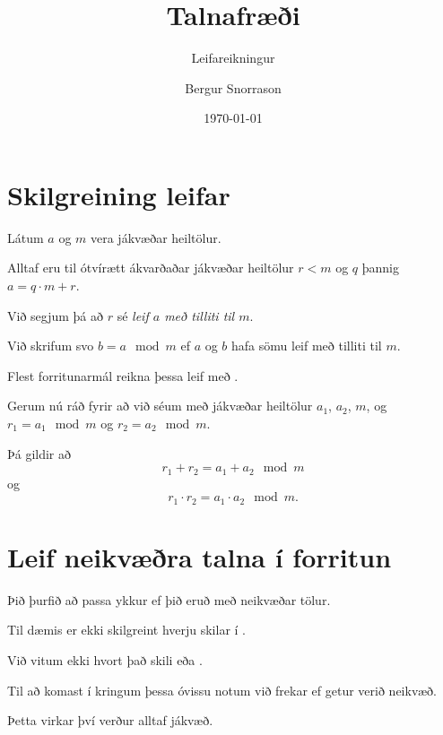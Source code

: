 \title{Talnafræði}
\subtitle{Leifareikningur}
\author{Bergur Snorrason}
\date{\today}



\frame{\titlepage}

\section{Skilgreining leifar}
{
    {
        \item<1-> Látum $a$ og $m$ vera jákvæðar heiltölur.
        \item<2-> Alltaf eru til ótvírætt ákvarðaðar jákvæðar heiltölur $r < m$ og $q$ þannig $a = q \cdot m + r$.
        \item<3-> Við segjum þá að $r$ sé \emph{leif $a$ með tilliti til $m$}.
        \item<4-> Við skrifum svo $b = a \mod m$ ef $a$ og $b$ hafa sömu leif með tilliti til $m$.
        \item<5-> Flest forritunarmál reikna þessa leif með .
        \item<6-> Gerum nú ráð fyrir að við séum með jákvæðar heiltölur $a_1$, $a_2$, $m$, og $r_1 = a_1 \mod m$ og $r_2 = a_2 \mod m$.
        \item<7-> Þá gildir að
        \[
            r_1 + r_2 = a_1 + a_2 \mod m
        \]
                og
        \[
            r_1 \cdot r_2 = a_1 \cdot a_2 \mod m.
        \]
    }
}

\section{Leif neikvæðra talna í forritun}
{
    {
        \item<1-> Þið þurfið að passa ykkur ef þið eruð með neikvæðar tölur.
        \item<2-> Til dæmis er ekki skilgreint hverju  skilar í .
        \item<3-> Við vitum ekki hvort það skili  eða .
        \item<4-> Til að komast í kringum þessa óvissu notum við frekar  ef  getur verið neikvæð.
        \item<5-> Þetta virkar því  verður alltaf jákvæð.
    }
}

